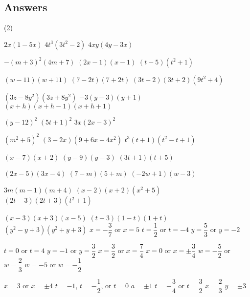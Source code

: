 \clearpage

\subsection{Answers}

\begin{tasks}(2)

\task $2x(1 - 5x)$ 
\task $4t^3(3t^2-2)$
\task $4xy(4y-3x)$

\task $-(m+3)^2(4m+7)$
\task $(2x-1)(x-1)$
\task $(t-5)(t^2+1)$

\task $(w-11)(w+11)$
\task $(7-2t)(7+2t)$
\task $(3t-2)(3t+2)(9t^2+4)$

\task $(3z-8y^2)(3z+8y^2)$
\task $-3(y - 3)(y+1)$
\task $(x+h)(x+h-1)(x+h+1)$

\task $(y-12)^2$
\task $(5t+1)^2$
\task $3x(2x-3)^2$

\task $(m^2+5)^2$
\task $(3-2x)(9 + 6x + 4x^2)$
\task $t^3(t+1)(t^2 - t + 1)$

\task $(x-7)(x+2)$
\task $(y-9)(y-3)$
\task $(3t+1)(t+5)$

\task $(2x-5)(3x-4)$
\task $(7-m)(5+m)$
\task $(-2w+1)(w-3)$

\task $3m(m-1)(m+4)$
\task $(x-2)(x+2)(x^2+5)$
\task $(2t-3)(2t+3)(t^2+1)$

\task $(x-3)(x+3)(x-5)$
\task $(t-3)(1-t)(1+t)$
\task $(y^2-y+3)(y^2+y+3)$
\task   $x = -\dfrac{3}{7}$ or $x = 5$ 
\task   $t = \dfrac{1}{2}$ or $t = -4$
\task   $y = \dfrac{5}{3}$ or $y = -2$

\task   $t = 0$ or $t = 4$
\task   $y = -1$ or $y = \dfrac{3}{2}$ 
\task   $x = \dfrac{3}{2}$ or $x = \dfrac{7}{4}$ 
\task $x = 0$ or $x = \pm \dfrac{3}{4}$ 
\task $w = -\dfrac{5}{2}$ or $w = \dfrac{2}{3}$
\task $w=-5$ or $w = -\dfrac{1}{2}$

\task $x=3$ or $x = \pm 4$ 
\task $t = -1$, $t= -\dfrac{1}{2}$, or $t = 0$
\task $a = \pm 1$
\task $t = -\dfrac{3}{4}$ or $t = \dfrac{3}{2}$
\task $x = \dfrac{2}{3}$
\task $y = \pm 3$  

\end{tasks}